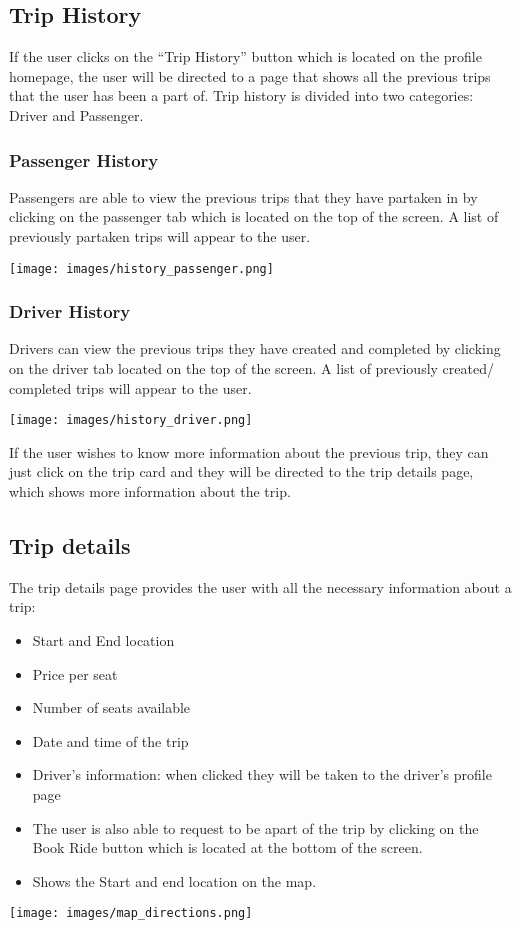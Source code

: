 \documentclass[hidelinks, 12pt, a4paper]{article}
\begin{document}
\subsection{Trip History}
If the user clicks on the “Trip History” button which is located on the profile homepage, the user will be directed to a page that shows all the previous trips that the user has been a part of. Trip history is divided into two categories: Driver and Passenger. 
\subsubsection{Passenger History}
Passengers are able to view the previous trips that they have partaken in by clicking on the passenger tab which is located on the top of the screen. A list of previously partaken trips will appear to the user.
\begin{center}
  \texttt{[image: images/history\_passenger.png]}
\end{center}
\subsubsection{Driver History}
Drivers can view the previous trips they have created and completed by clicking on the driver tab located on the top of the screen. A list of previously created/ completed trips will appear to the user.
\begin{center}
  \texttt{[image: images/history\_driver.png]}
\end{center}
If the user wishes to know more information about the previous trip, they can just click on the trip card and they will be directed to the trip details page, which shows more information about the trip.
\vspace{1cm}

\subsection{Trip details}
The trip details page provides the user with all the necessary information about a trip:
\begin{itemize}
    \item Start and End location
    \item Price per seat
    \item Number of seats available
    \item Date and time of the trip
    \item Driver’s information: when clicked they will be taken to the driver’s profile page
    \item The user is also able to request to be apart of the trip by clicking on the Book Ride button which is located at the bottom of the screen.
    \item Shows the Start and end location on the map.
\end{itemize}
\begin{center}
  \texttt{[image: images/map\_directions.png]}
\end{center}
\end{document}
